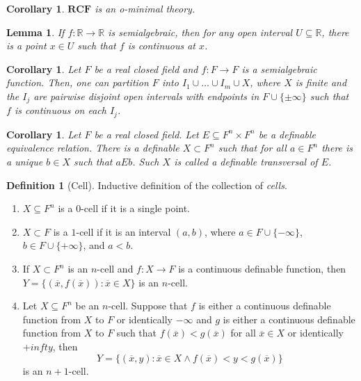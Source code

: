 \documentclass{amsart}
\newtheorem{lemma}[theorem]{Lemma}
\newtheorem{corollary}[theorem]{Corollary}
\theoremstyle{definition}
\newtheorem{definition}[theorem]{Definition}
\numberwithin{equation}{section}
\begin{document}
\begin{corollary}
  $\mathbf{RCF}$ is an o-minimal theory.
\end{corollary}

\begin{lemma}
  If $f:\mathbb{R} \to \mathbb{R}$ is semialgebraic,
  then for any open interval $U \subseteq \mathbb{R}$,
  there is a point $x\in U$ such that $f$ is continuous at $x$.
\end{lemma}

\begin{corollary}
  Let $F$ be a real closed field and $f: F \to F$ is a semialgebraic function.
  Then, one can partition $F$ into $I_1\cup \dots \cup I_m\cup X$,
  where $X$ is finite and the $I_j$ are pairwise disjoint open intervals with endpoints in $F\cup \{\pm\infty\}$
  such that $f$ is continuous on each $I_j$.
\end{corollary}


\begin{corollary}
  Let $F$ be a real closed field.
  Let $E \subseteq F^n \times F^n$ be a definable equivalence relation.
  There is a definable $X \subset F^n$ such that for all
  $a \in F^n$ there is a unique $b\in X$ such that $aEb$.
  Such $X$ is called a definable \emph{transversal} of $E$.
\end{corollary}

\begin{definition}[Cell]
  Inductive definition of the collection of \emph{cells}.
  \begin{enumerate}[label = {$\bullet$}]
    \item $X \subseteq F^n$ is a $0$-cell if it is a single point.
    \item $X \subset F$ is a $1$-cell if it is an interval $(a,b)$,
      where $a \in F \cup \{-\infty\}$, $b\in F\cup \{+\infty\}$, and $a < b$.
    \item If $X \subset F^n$ is an $n$-cell and $f: X\to F$ is a continuous definable function,
      then $Y = \{(\overline{x},f(\overline{x})): \overline{x} \in X\}$ is an $n$-cell.
    \item Let $X \subseteq F^n$ be an $n$-cell. Suppose that $f$ is
      either a continuous definable function from $X$ to $F$ or identically $-\infty$ and
      $g$ is either a continuous definable function from $X$ to $F$
      such that $f(\overline{x}) < g(\overline{x})$ for all $\overline{x} \in X$ or identically $+infty$, then
      \[
        Y = \{(\overline{x},y): \overline{x} \in X \land f(\overline{x}) < y < g(\overline{x})\}
      \]
      is an $n+1$-cell.
  \end{enumerate}
\end{definition}
\end{document}
